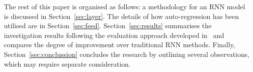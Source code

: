 %
%
The rest of this paper is organised as follows: a methodology for an RNN model is discussed in Section~\ref{sec:layer}.
The details of how auto-regression has been utilised are in Section~\ref{sec:feed}.
Section~\ref{sec:results} summarises the investigation results following the evaluation approach developed in~\cite{sadykov_practical_2022} and compares the degree of improvement over traditional RNN methods.
Finally, Section~\ref{sec:conclussion} concludes the research by outlining several observations, which may require separate consideration.
